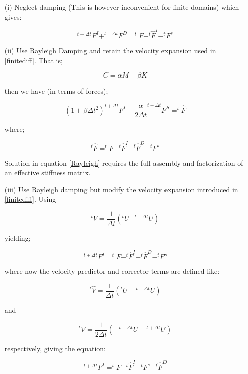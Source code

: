 \documentclass[12pt,letterpaper]{article}
\begin{document}
\begin{itemize}
\item[(i)] Neglect damping (This is however inconvenient for finite domains) which gives:

\begin{equation}
^{t+\Delta t}F^I+^{t+\Delta t}F^D=^{t}F-^t\hat {F}^I-^{t}F^s
\label{Nodamping}
\end{equation}





\item[(ii)] Use Rayleigh Damping and retain the velocity expansion used in \eqref{finitediff}. That is;

\begin{equation}
C=\alpha M+\beta K
\end{equation}

then we have (in terms of forces);

\begin{equation}
(1+\beta \Delta t^2) ^{t+\Delta t}F^I+\dfrac{\alpha}{2\Delta t} ^{t+\Delta t}F^S=^{t}\hat{F}
\label{Rayleigh}
\end{equation}

where;

\[
^{t}\hat{F}=^{t}F-^t\hat {F}^I-^t\hat {F}^D-^{t}F^s
\]

Solution in equation \cref{Rayleigh} requires the full assembly and factorization of an effective stiffness matrix.



\item[(iii)] Use Rayleigh damping but modify the velocity expansion introduced in \cref{finitediff}. Using

\begin{equation}
^{t}V=\dfrac{1}{\Delta t}(^{t}U-^{t-\Delta t}U)
\label{velocity}
\end{equation}

yielding;

\begin{equation}
^{t+\Delta t}F^I=^{t}F-^t\hat {F}^I-^t\hat {F}^D-^{t}F^s
\end{equation}


where now the velocity predictor and corrector terms are defined like:

\[{}^t\hat V = \frac{1}{{\Delta t}}\left( {{}^tU - {}^{t - \Delta t}U} \right)\]

and 

\[{}^tV = \frac{1}{{2\Delta t}}\left( { - {}^{t - \Delta t}U + {}^{t + \Delta t}U} \right)\]

respectively, giving the equation:

\begin{equation}
^{t+\Delta t}F^I=^{t}F-^t\hat {F}^I-^{t}F^s-^t\hat {F}^D
\label{modvelocity}
\end{equation}

\end{itemize}
\end{document}
